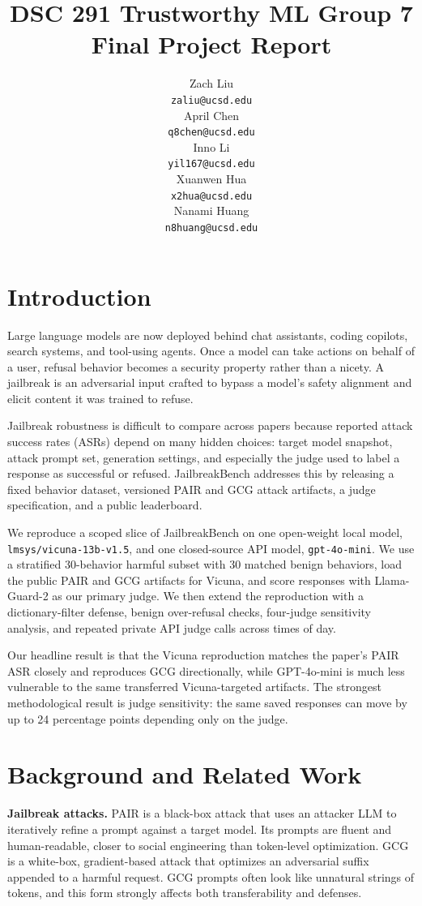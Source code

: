 \documentclass{article}
\title{DSC 291 Trustworthy ML Group 7 Final Project Report}
\author{%
  Zach Liu\\
  \texttt{zaliu@ucsd.edu} \\
  \And
  April Chen\\
  \texttt{q8chen@ucsd.edu} \\
  \And
  Inno Li\\
  \texttt{yil167@ucsd.edu} \\
  \And
  Xuanwen Hua\\
  \texttt{x2hua@ucsd.edu} \\
  \And
  Nanami Huang\\
  \texttt{n8huang@ucsd.edu} \\
}
\begin{document}
\maketitle

\section{Introduction}

Large language models are now deployed behind chat assistants, coding copilots, search systems, and tool-using agents. Once a model can take actions on behalf of a user, refusal behavior becomes a security property rather than a nicety. A jailbreak is an adversarial input crafted to bypass a model's safety alignment and elicit content it was trained to refuse.

Jailbreak robustness is difficult to compare across papers because reported attack success rates (ASRs) depend on many hidden choices: target model snapshot, attack prompt set, generation settings, and especially the judge used to label a response as successful or refused. JailbreakBench \cite{chao2024jailbreakbench} addresses this by releasing a fixed behavior dataset, versioned PAIR and GCG attack artifacts, a judge specification, and a public leaderboard.

We reproduce a scoped slice of JailbreakBench on one open-weight local model, \texttt{lmsys/vicuna-13b-v1.5}, and one closed-source API model, \texttt{gpt-4o-mini}. We use a stratified 30-behavior harmful subset with 30 matched benign behaviors, load the public PAIR and GCG artifacts for Vicuna, and score responses with Llama-Guard-2 as our primary judge. We then extend the reproduction with a dictionary-filter defense, benign over-refusal checks, four-judge sensitivity analysis, and repeated private API judge calls across times of day.

Our headline result is that the Vicuna reproduction matches the paper's PAIR ASR closely and reproduces GCG directionally, while GPT-4o-mini is much less vulnerable to the same transferred Vicuna-targeted artifacts. The strongest methodological result is judge sensitivity: the same saved responses can move by up to 24 percentage points depending only on the judge.

\section{Background and Related Work}

\textbf{Jailbreak attacks.} PAIR \cite{chao2023pair} is a black-box attack that uses an attacker LLM to iteratively refine a prompt against a target model. Its prompts are fluent and human-readable, closer to social engineering than token-level optimization. GCG \cite{zou2023gcg} is a white-box, gradient-based attack that optimizes an adversarial suffix appended to a harmful request. GCG prompts often look like unnatural strings of tokens, and this form strongly affects both transferability and defenses.
\end{document}

